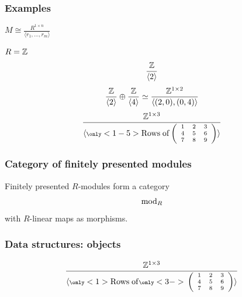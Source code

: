  \begin{frame}[fragile]
  \frametitle{Examples}
   $M \cong \frac{R^{1 \times n}}{\langle r_1, \dots, r_m \rangle}$
   \pause
   \begin{block}{$R =\mathbb{Z}$}
    \pause
    \[
     \frac{\mathbb{Z}}{\langle 2 \rangle}
    \]
    \pause
    \[
      \frac{\mathbb{Z}}{\langle 2 \rangle} \oplus \frac{\mathbb{Z}}{\langle 4 \rangle} \simeq \frac{\mathbb{Z}^{1 \times 2}}{\langle (2,0),(0,4) \rangle}
    \]
    \pause
    \[
    \frac{\Z^{1 \times 3}}{\scriptsize
    \langle
    \only<1-5>{
    \mathrm{Rows~of}
    }
    \left(
   \begin{array}{ccc}
    1 & 2 & 3 \\
    4 & 5 & 6 \\
    7 & 8 & 9 \\
   \end{array}
 \right)
 \rangle
 }
 \]
   \end{block}
  \pause
 \end{frame}

 \begin{frame}[fragile]
  \frametitle{Category of finitely presented modules}
  \begin{block}{}
  Finitely presented $R$-modules form a category
  \pause
  \[
  \mathrm{mod}_{R} 
  \]
  \pause
  with $R$-linear maps as morphisms.
  \end{block}
  \pause
  \begin{center}
   \textbf{\color{computerfriendly}{Computerfriendly model?}}
  \end{center}
 \end{frame}

\begin{frame}[fragile]
  \frametitle{Data structures: objects}
  
  \[
    \frac{\Z^{1 \times 3}}{\scriptsize
    \langle
    \only<1>{
    \mathrm{Rows~of}
    }
    \only<3->{
    \color{blue}
    }
    \left(
      \begin{array}{ccc}
        1 & 2 & 3 \\
        4 & 5 & 6 \\
        7 & 8 & 9 \\
       \end{array}
 \right)
 \rangle
 }
 \]
 
 \end{frame}

